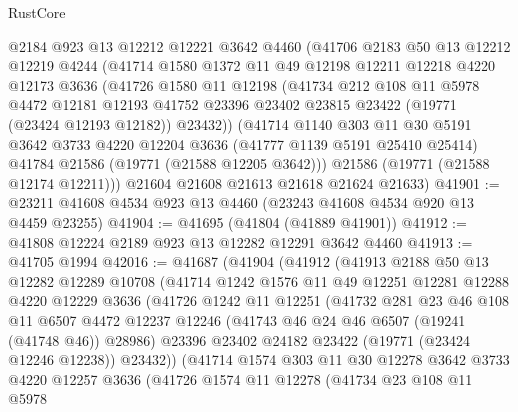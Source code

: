 \begin{lexlean}{RustCore}
\begin{coremodule}
    @2184
    @923
    @13
    @12212
    @12221
    @3642
    @4460
    (@41706
      @2183
      @50
      @13
      @12212
      @12219
      @4244
      (@41714
        @1580
        @1372
        @11
        @49
        @12198
        @12211
        @12218
        @4220
        @12173
        @3636
        (@41726
          @1580
          @11
          @12198
          (@41734
            @212
            @108
            @11
            @5978
            @4472
            @12181
            @12193
            @41752
            @23396
            @23402
            @23815
            @23422
            (@19771 (@23424 @12193 @12182))
            @23432))
        (@41714
          @1140
          @303
          @11
          @30
          @5191
          @3642
          @3733
          @4220
          @12204
          @3636
          (@41777 @1139 @5191 @25410 @25414)
          @41784
          @21586
          (@19771 (@21588 @12205 @3642)))
        @21586
        (@19771 (@21588 @12174 @12211)))
      @21604
      @21608
      @21613
      @21618
      @21624
      @21633)
@41901 := @23211 @41608 @4534 @923 @13 @4460 (@23243 @41608 @4534 @920 @13 @4459 @23255)
@41904 := @41695 (@41804 (@41889 @41901))
@41912 := @41808 @12224 @2189 @923 @13 @12282 @12291 @3642 @4460
@41913 := @41705 @1994
@42016 := @41687
    (@41904
      (@41912
        (@41913
          @2188
          @50
          @13
          @12282
          @12289
          @10708
          (@41714
            @1242
            @1576
            @11
            @49
            @12251
            @12281
            @12288
            @4220
            @12229
            @3636
            (@41726
              @1242
              @11
              @12251
              (@41732
                @281
                @23
                @46
                @108
                @11
                @6507
                @4472
                @12237
                @12246
                (@41743 @46 @24 @46 @6507 (@19241 (@41748 @46)) @28986)
                @23396
                @23402
                @24182
                @23422
                (@19771 (@23424 @12246 @12238))
                @23432))
            (@41714
              @1574
              @303
              @11
              @30
              @12278
              @3642
              @3733
              @4220
              @12257
              @3636
              (@41726
                @1574
                @11
                @12278
                (@41734
                  @23
                  @108
                  @11
                  @5978

\end{coremodule}
\end{lexlean}
